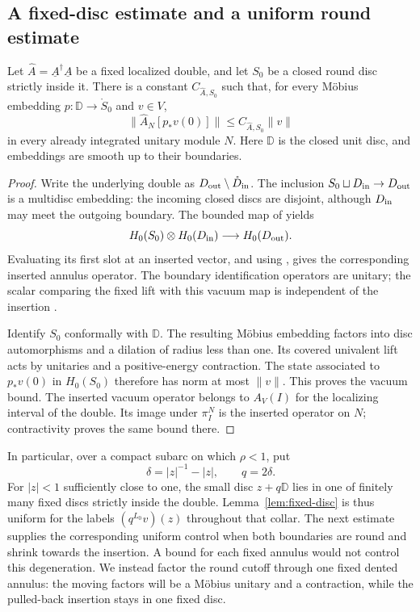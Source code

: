 \subsection{A fixed-disc estimate and a uniform round estimate}

\begin{lemma}\label{lem:fixed-disc}
Let $\widehat A=\underline A^\dagger\underline A$ be a fixed localized
double, and let $S_0$ be a closed round disc strictly inside it.
There is a constant $C_{\widehat A,S_0}$ such that, for every Möbius
embedding $p:\mathbb D\to\mathring S_0$ and $v\in V$,
\begin{equation}\label{eq:fixed-disc-bound}
 \|\widehat A_N[p_*v(0)]\|
     \leq C_{\widehat A,S_0}\|v\|
\end{equation}
in every already integrated unitary module $N$.  Here $\mathbb D$ is the
closed unit disc, and embeddings are smooth up to their boundaries.
\end{lemma}

\begin{proof}
Write the underlying double as $D_{\rm out}\setminus
\mathring D_{\rm in}$.  The inclusion
$S_0\sqcup D_{\rm in}\to D_{\rm out}$ is a multidisc embedding: the
incoming closed discs are disjoint, although $D_{\rm in}$ may meet the
outgoing boundary.  The bounded map of
\cite[Theorem~A, or Theorem~3.6]{HTGenusZero} yields
\[
 H_0(S_0)\otimes H_0(D_{\rm in})\longrightarrow H_0(D_{\rm out}).
\]
Evaluating its first slot at an inserted vector, and using
\cite[Corollary~A.1]{HTGenusZero}, gives the corresponding inserted
annulus operator.  The boundary identification operators are unitary;
the scalar comparing the fixed lift with this vacuum map is independent
of the insertion \cite[Lemma~6.10]{HTVOA}.

Identify $S_0$ conformally with $\mathbb D$.  The resulting Möbius
embedding factors into disc automorphisms and a dilation of radius less
than one.  Its covered univalent lift acts by unitaries and a
positive-energy contraction.  The state associated to $p_*v(0)$ in
$H_0(S_0)$ therefore has norm at most $\|v\|$.  This proves the vacuum
bound.  The inserted vacuum operator belongs to $A_V(I)$ for the
localizing interval of the double.  Its image under $\pi_I^N$ is the
inserted operator on $N$; contractivity proves the same bound there.
\end{proof}

In particular, over a compact subarc on which $\rho<1$, put
\[
 \delta=|z|^{-1}-|z|,\qquad q=2\delta.
\]
For $|z|<1$ sufficiently close to one, the small disc
$z+q\mathbb D$ lies in one of finitely many fixed discs strictly inside
the double.  Lemma~\ref{lem:fixed-disc} is thus uniform for the labels
$(q^{L_0}v)(z)$ throughout that collar.  The next estimate supplies the
corresponding uniform control when both boundaries are round and shrink
towards the insertion.  A bound for each fixed annulus would not control
this degeneration.  We instead factor the round cutoff through one fixed
dented annulus: the moving factors will be a M\"obius unitary and a
contraction, while the pulled-back insertion stays in one fixed disc.

